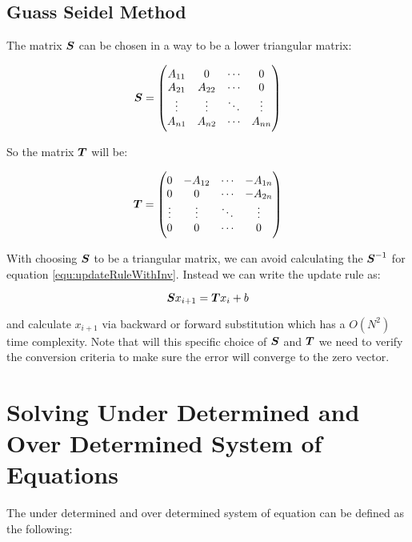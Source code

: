 \subsection{Guass Seidel Method}

The matrix $\boldsymbol{S}$ can be chosen in a way to be a lower triangular matrix:

\begin{equation}
	\boldsymbol{S} =
	\begin{pmatrix}
		A_{11} & 0  & \cdots & 0\\
		A_{21} & A_{22}  & \cdots & 0\\
		\vdots & \vdots & \ddots & \vdots \\
		A_{n1} & A_{n2} & \cdots & A_{nn}
	\end{pmatrix}
\end{equation}

So the matrix $\boldsymbol{T} $ will be:

\begin{equation}
	\boldsymbol{T} = 
	\begin{pmatrix}
		0 & -A_{12} & \cdots & -A_{1n} \\
		0 & 0 & \cdots & -A_{2n} \\
		\vdots & \vdots & \ddots & \vdots \\
		0 & 0 & \cdots & 0
	\end{pmatrix}
\end{equation}


With choosing $\boldsymbol{S}$ to be a triangular matrix, we can avoid calculating the $\boldsymbol{S}^{-1}$ for equation \ref{equ:updateRuleWithInv}. Instead we can write the update rule as:

\begin{equation}
	\boldsymbol{S}x_{i+1} = \boldsymbol{T}x_i + b
	\label{equ:updateRule}
\end{equation}

and calculate $x_{i+1}$ via backward or forward substitution which has a $O(N^2)$ time complexity. Note that will this specific choice of $\boldsymbol{S}$ and $ \boldsymbol{T} $ we need to verify the conversion criteria to make sure the error will converge to the zero vector.


\section{Solving Under Determined and Over Determined System of Equations}

The under determined and over determined system of equation can be defined as the following:

